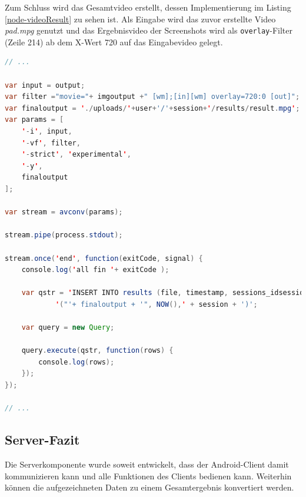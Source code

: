 Zum Schluss wird das Gesamtvideo erstellt, dessen Implementierung im Listing \ref{node-videoResult} zu sehen ist. 
Als Eingabe wird das zuvor erstellte Video \emph{pad.mpg} genutzt und das Ergebnisvideo der Screenshots wird als \texttt{overlay}-Filter (Zeile 214) ab dem X-Wert 720 auf das Eingabevideo gelegt.

\begin{lstlisting}[label=node-videoResult,language=Java, caption=Gesamtvideo kombinieren, firstnumber=211]
// ...

var input = output;
var filter ="movie="+ imgoutput +" [wm];[in][wm] overlay=720:0 [out]";
var finaloutput = './uploads/'+user+'/'+session+'/results/result.mpg';
var params = [
	'-i', input,
	'-vf', filter,
	'-strict', 'experimental',
	'-y',
	finaloutput
];

var stream = avconv(params);

stream.pipe(process.stdout);

stream.once('end', function(exitCode, signal) {
	console.log('all fin '+ exitCode );

	var qstr = 'INSERT INTO results (file, timestamp, sessions_idsessions) VALUES ' +
			'("'+ finaloutput + '", NOW(),' + session + ')';

	var query = new Query;

	query.execute(qstr, function(rows) {
		console.log(rows);
	});
});

// ...
\end{lstlisting}

\subsection{Server-Fazit}

Die Serverkomponente wurde soweit entwickelt, dass der Android-Client damit kommunizieren kann und alle Funktionen des Clients bedienen kann.
Weiterhin können die aufgezeichneten Daten zu einem Gesamtergebnis konvertiert werden. 

